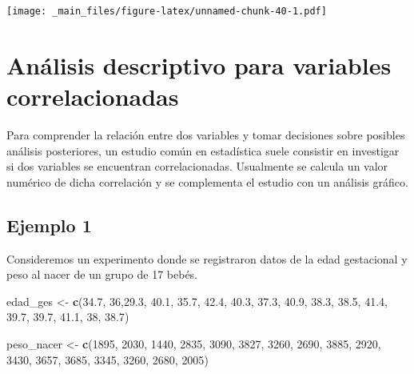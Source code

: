\documentclass[
]{book}
\newenvironment{Shaded}{\begin{snugshade}}{\end{snugshade}}
\newcommand{\DecValTok}[1]{\textcolor[rgb]{0.00,0.00,0.81}{#1}}
\newcommand{\FloatTok}[1]{\textcolor[rgb]{0.00,0.00,0.81}{#1}}
\newcommand{\FunctionTok}[1]{\textcolor[rgb]{0.13,0.29,0.53}{\textbf{#1}}}
\newcommand{\NormalTok}[1]{#1}
\newcommand{\OtherTok}[1]{\textcolor[rgb]{0.56,0.35,0.01}{#1}}
\begin{document}
\texttt{[image: \_main\_files/figure-latex/unnamed-chunk-40-1.pdf]}

\hypertarget{anuxe1lisis-descriptivo-para-variables-correlacionadas}{%
\chapter{Análisis descriptivo para variables correlacionadas}\label{anuxe1lisis-descriptivo-para-variables-correlacionadas}}

Para comprender la relación entre dos variables y tomar decisiones sobre posibles análisis posteriores, un estudio común en estadística suele consistir en investigar si dos variables se encuentran correlacionadas. Usualmente se calcula un valor numérico de dicha correlación y se complementa el estudio con un análisis gráfico.

\hypertarget{ejemplo-1-1}{%
\section{Ejemplo 1}\label{ejemplo-1-1}}

Consideremos un experimento donde se registraron datos de la edad gestacional y peso al nacer de un grupo de 17 bebés.

\begin{Shaded}
\begin{Highlighting}[]
\NormalTok{edad\_ges }\OtherTok{\textless{}{-}} \FunctionTok{c}\NormalTok{(}\FloatTok{34.7}\NormalTok{, }\DecValTok{36}\NormalTok{,}\FloatTok{29.3}\NormalTok{, }\FloatTok{40.1}\NormalTok{, }\FloatTok{35.7}\NormalTok{, }\FloatTok{42.4}\NormalTok{, }\FloatTok{40.3}\NormalTok{, }\FloatTok{37.3}\NormalTok{, }\FloatTok{40.9}\NormalTok{, }
              \FloatTok{38.3}\NormalTok{, }\FloatTok{38.5}\NormalTok{, }\FloatTok{41.4}\NormalTok{, }\FloatTok{39.7}\NormalTok{, }\FloatTok{39.7}\NormalTok{, }\FloatTok{41.1}\NormalTok{, }\DecValTok{38}\NormalTok{, }\FloatTok{38.7}\NormalTok{)}

\NormalTok{peso\_nacer }\OtherTok{\textless{}{-}} \FunctionTok{c}\NormalTok{(}\DecValTok{1895}\NormalTok{, }\DecValTok{2030}\NormalTok{, }\DecValTok{1440}\NormalTok{, }\DecValTok{2835}\NormalTok{, }\DecValTok{3090}\NormalTok{, }\DecValTok{3827}\NormalTok{, }\DecValTok{3260}\NormalTok{, }\DecValTok{2690}\NormalTok{, }
                \DecValTok{3885}\NormalTok{, }\DecValTok{2920}\NormalTok{, }\DecValTok{3430}\NormalTok{, }\DecValTok{3657}\NormalTok{, }\DecValTok{3685}\NormalTok{, }\DecValTok{3345}\NormalTok{, }\DecValTok{3260}\NormalTok{, }\DecValTok{2680}\NormalTok{, }\DecValTok{2005}\NormalTok{)}
\end{Highlighting}
\end{Shaded}
\end{document}
